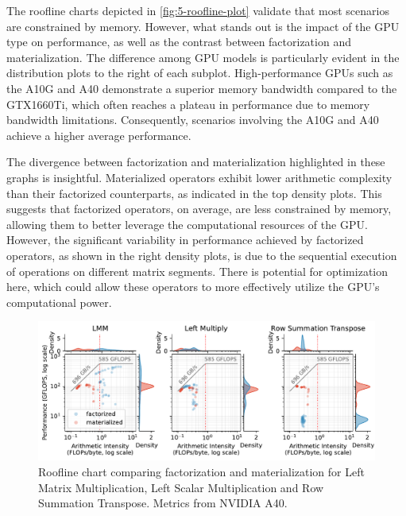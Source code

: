 The roofline charts depicted in \autoref{fig:5-roofline-plot} validate that most scenarios are constrained by memory. However, what stands out is the impact of the GPU type on performance, as well as the contrast between factorization and materialization. The difference among GPU models is particularly evident in the distribution plots to the right of each subplot. High-performance GPUs such as the A10G and A40 demonstrate a superior memory bandwidth compared to the GTX1660Ti, which often reaches a plateau in performance due to memory bandwidth limitations. Consequently, scenarios involving the A10G and A40 achieve a higher average performance.

The divergence between factorization and materialization highlighted in these graphs is insightful. Materialized operators exhibit lower arithmetic complexity than their factorized counterparts, as indicated in the top density plots. This suggests that factorized operators, on average, are less constrained by memory, allowing them to better leverage the computational resources of the GPU. However, the significant variability in performance achieved by factorized operators, as shown in the right density plots, is due to the sequential execution of operations on different matrix segments. There is potential for optimization here, which could allow these operators to more effectively utilize the GPU’s computational power.

\begin{figure}[ht]
    \centering
    \includegraphics[width=\linewidth]{chapters/05_cost_estimation/figures/roofline-operators.pdf}
    \caption[Roofline chart per operator]{Roofline chart comparing factorization and materialization for Left Matrix Multiplication, Left Scalar Multiplication and Row Summation Transpose. Metrics from NVIDIA A40.}
    \label{fig:5-roofline-operators}
\end{figure}

